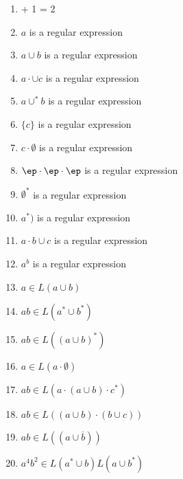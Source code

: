 \begin{enumerate}

\item {} + 1 = 2

\item \tf $a$ is a regular expression

\item \tf $a\cup b$ is a regular expression

\item \tf $a \cdot \cup c$ is a regular expression

\item \tf $a \cup^* b$ is a regular expression

\item \tf $\{c\}$ is a regular expression

\item \tf $c \cdot \emptyset $ is a regular expression

\item \tf $\ep \cdot \ep \cdot \ep$ is a regular expression

\item \tf $\emptyset^*$ is a regular expression

\item \tf $a^*)$ is a regular expression

\item \tf $a\cdot b \cup c$ is a regular expression

\item \tf $a^b$ is a regular expression

\item \tf $a \in L(a \cup b)$

\item \tf $ab \in L(a^* \cup b^*)$

\item \tf $ab \in L((a \cup b)^*)$

\item \tf $a \in L(a \cdot \emptyset)$

\item \tf $ab \in L(a \cdot (a \cup b) \cdot c^*)$

\item \tf $ab \in L((a \cup b) \cdot (b \cup c))$

\item \tf $ab \in L((a \cup \overline{b}))$

\item \tf $a^4 b^2 \in L(a^* \cup b) L(a \cup b^*)$

\end{enumerate}


